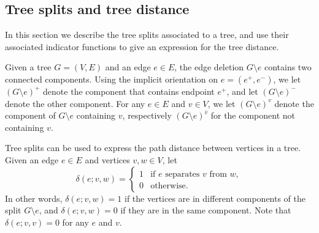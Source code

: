 \documentclass{amsart}
\theoremstyle{definition}
\begin{document}
\subsection{Tree splits and tree distance}
\label{sec:tree-splits}

In this section we describe the tree splits associated to a tree, and use their associated indicator functions to give an expression for the tree distance.

Given a tree $G = (V,E)$ and an edge $e \in E$, the edge deletion $G \setminus e$ contains two connected components.
Using the implicit orientation on $e = (e^+,e^-)$,
we let $(G \setminus e)^+$ denote the component that contains endpoint $e^+$, and let $(G\setminus e)^-$ denote the other component.
For any $e \in E$ and $v \in V$,
we let
$(G \setminus e)^{v}$ denote the component of $G\setminus e$ containing $v$,
respectively $(G\setminus e)^{\overline v}$ for the component not containing $v$.


Tree splits can be used to express the path distance between vertices in a tree.
Given an edge $e\in E$ and vertices $v,w \in V$, let 
\begin{equation}
\delta(e;v,w) = \begin{cases}
	1 &\text{if $e$ separates  $v$ from $w$}, \\
	0 &\text{otherwise}.
\end{cases}
\end{equation}
In other words, $\delta(e; v,w) = 1$ if the vertices are in different components of the split $G \setminus e$,
and $\delta(e; v,w) = 0$ if they are in the same component.
Note that $\delta(e; v,v) = 0$ for any $e$ and $v$.
\end{document}
